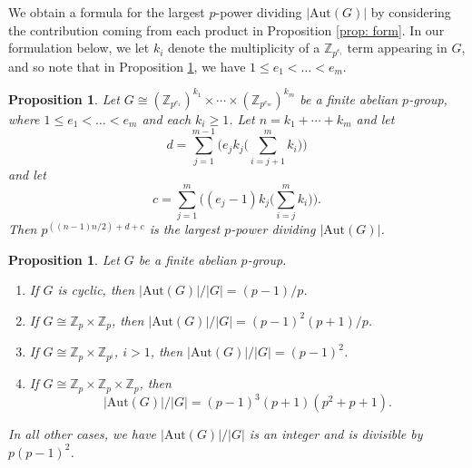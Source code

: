 \documentclass[12pt]{amsart}
\newtheorem{proposition}[theorem]{Proposition}
\begin{document}
We obtain a formula for the largest $p$-power dividing $|\mathrm{Aut}(G)|$ by considering the contribution coming from each product in Proposition \ref{prop: form}.  In our formulation below, we let $k_i$ denote the multiplicity of a $\mathbb{Z}_{p^{e_i}}$ term appearing in $G$, and so note that in Proposition \ref{prop: dc}, we have $1 \leq e_1 < \dots < e_m$.

\begin{proposition}\label{prop: dc}
Let $G \cong (\mathbb{Z}_{p^{e_1}})^{k_1} \times \cdots \times (\mathbb{Z}_{p^{e_m}})^{k_m}$ be a finite abelian $p$-group, where $1 \leq e_1 < \dots < e_m$ and each $k_i \geq 1$.  Let $n = k_1 + \cdots + k_m$ and let $$d = \sum_{j=1}^{m-1} \Big( e_j k_j \big(\sum_{i=j+1}^m k_i \big) \Big)$$ and let $$c = \sum_{j=1}^{m} \Big( (e_j-1)k_j\big(\sum_{i=j}^m k_i \big) \Big).$$  Then $p^{((n-1)n/2) + d + c}$ is the largest $p$-power dividing $|\mathrm{Aut}(G)|$.
\end{proposition}

\begin{proposition}\label{prop: class}
Let $G$ be a finite abelian $p$-group.  
\begin{enumerate}
\item If $G$ is cyclic, then $|\mathrm{Aut}(G)|/|G| = (p-1)/p$.
\item If $G \cong \mathbb{Z}_{p} \times \mathbb{Z}_{p}$, then $|\mathrm{Aut}(G)|/|G| = (p-1)^2(p+1)/p$.
\item If $G \cong \mathbb{Z}_{p} \times \mathbb{Z}_{p^i}$, $i > 1$, then $|\mathrm{Aut}(G)|/|G| = (p-1)^2$.
\item If $G \cong \mathbb{Z}_{p} \times \mathbb{Z}_{p} \times \mathbb{Z}_{p}$, then $$|\mathrm{Aut}(G)|/|G| =(p-1)^3(p+1)(p^2+p+1).$$
\end{enumerate}
In all other cases, we have $|\mathrm{Aut}(G)|/|G|$ is an integer and is divisible by $p(p-1)^2$.
\end{proposition}
\end{document}
